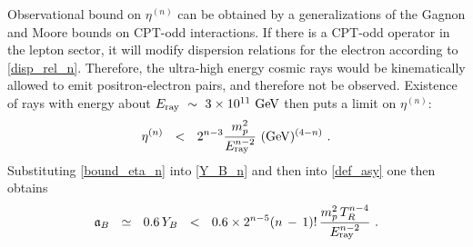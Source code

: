 \documentclass[12pt]{revtex4}
\newcommand{\Eray}{E_{\rm ray}}
\newcommand{\GeV}{{\rm GeV}}
\begin{document}
	Observational bound on $ \eta^{(n)} $ can be obtained by a generalizations
	of the Gagnon and Moore bounds 
\cite{Gagnon:2004xh} 
	on CPT-odd interactions.
	If there is a CPT-odd operator in the lepton sector, it will modify dispersion
	relations for the electron according to \eqref{disp_rel_n}.
	Therefore, the ultra-high energy cosmic rays would be kinematically allowed to 
	emit positron-electron pairs, and therefore not be observed.
	Existence of rays with energy about $ \Eray ~\sim~ 3\times10^{11}~\GeV $ then 
	puts a limit on $ \eta^{(n)} $:
\begin{equation}
\label{bound_eta_n}
	\eta^{(n)} ~~<~~ 
	2^{n-3} \frac{m_p^2}{\Eray^{n-2}}~(\GeV)^{(4-n)}~.
\end{equation}
%
	Substituting \eqref{bound_eta_n} into \eqref{Y_B_n} and then into 
	\eqref{def_asy} one then obtains
\begin{align}
\notag
	\mathfrak{a}_B ~~\simeq~~ 0.6 \, Y_B
	~~<~~ 
		0.6 \times 2^{n-5} (n\,-\,1)!\, \frac{m_p^2\, T_R^{n-4}}{\Eray^{n-2}}~.
\end{align}
\end{document}
